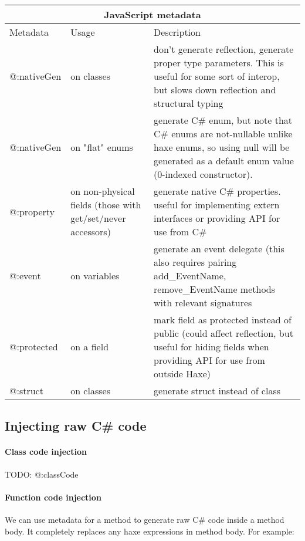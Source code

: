 \begin{center}
\begin{tabular}{| l | l | l |}
	\hline
	\multicolumn{3}{|c|}{JavaScript metadata} \\ \hline
	Metadata & Usage & Description \\ \hline
	@:nativeGen  &  on classes & don't generate reflection, generate proper type parameters. This is useful for some sort of interop, but slows down reflection and structural typing \\
	@:nativeGen  &  on "flat" enums & generate C\# enum, but note that C\# enums are not-nullable unlike haxe enums, so using null will be generated as a default enum value (0-indexed constructor). \\
	@:property  &  on non-physical fields (those with get/set/never accessors) & generate native C\# properties. useful for implementing extern interfaces or providing API for use from C\# \\
	@:event  &  on variables & generate an event delegate (this also requires pairing add_EventName, remove_EventName methods with relevant signatures \\
	@:protected  &  on a field & mark field as protected instead of public (could affect reflection, but useful for hiding fields when providing API for use from outside Haxe) \\
	@:struct  &  on classes  &  generate struct instead of class \\
\end{tabular}
\end{center}

\subsection{Injecting raw C\# code}
\label{target-cs-code-injection}

\paragraph{Class code injection}

TODO: @:classCode

\paragraph{Function code injection}

We can use  metadata for a method to generate raw C\# code inside a method body. It completely replaces any haxe expressions in method body. For example:

